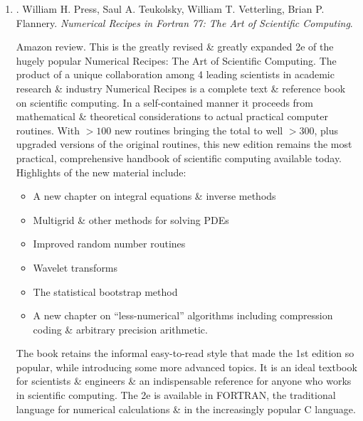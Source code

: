 \documentclass{article}
\begin{document}
\begin{enumerate}
	\item \cite{Press_Teukolsky_Vetterling_Flannery_recipe_Fortran77}. {\sc William H. Press, Saul A. Teukolsky, William T. Vetterling, Brian P. Flannery}. {\it Numerical Recipes in Fortran 77: The Art of Scientific Computing}. {}
	
	{\sf Amazon review.} This is the greatly revised \& greatly expanded 2e of the hugely popular Numerical Recipes: The Art of Scientific Computing. The product of a unique collaboration among 4 leading scientists in academic research \& industry Numerical Recipes is a complete text \& reference book on scientific computing. In a self-contained manner it proceeds from mathematical \& theoretical considerations to actual practical computer routines. With $> 100$ new routines bringing the total to well $> 300$, plus upgraded versions of the original routines, this new edition remains the most practical, comprehensive handbook of scientific computing available today. Highlights of the new material include:
	\begin{itemize}
		\item A new chapter on integral equations \& inverse methods
		\item Multigrid \& other methods for solving PDEs
		\item Improved random number routines
		\item Wavelet transforms
		\item The statistical bootstrap method
		\item A new chapter on ``less-numerical'' algorithms including compression coding \& arbitrary precision arithmetic.
	\end{itemize}
	The book retains the informal easy-to-read style that made the 1st edition so popular, while introducing some more advanced topics. It is an ideal textbook for scientists \& engineers \& an indispensable reference for anyone who works in scientific computing. The 2e is available in FORTRAN, the traditional language for numerical calculations \& in the increasingly popular C language.
	

\end{enumerate}
\end{document}
